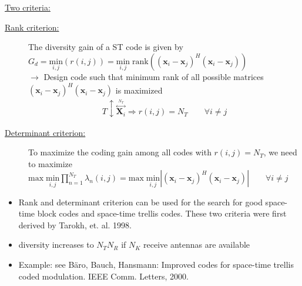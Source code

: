 \documentclass[a4paper, 10pt]{article}
\begin{document}
\vspace{1.6cm}
{\large\underline{Two criteria:}}\\
	\begin{description}
		\item[\underline{Rank criterion:}]The diversity gain of a ST code is given by \\
		$G_d=\underset{i,j}{\mathrm{min}}(r(i,j))=\underset{i,j}{\mathrm{min}}\;\mathrm{rank}\left((\mathbf{x}_i-\mathbf{x}_j)^H(\mathbf{x}_i-\mathbf{x}_j)\right)$\\
		$\rightarrow$ Design code such that minimum rank of all possible matrices $(\mathbf{x}_i-\mathbf{x}_j)^H(\mathbf{x}_i-\mathbf{x}_j)$ is maximized
		\begin{align*}
			T \updownarrow  \overset{\overset{N_T}{\longleftrightarrow}}{\mathbf{X}_i} \Rightarrow r(i,j)=N_T\qquad \forall i\neq j
		\end{align*}
		\item[\underline{Determinant criterion:}]To maximize the coding gain among all codes with $r(i,j)=N_T$, we need to maximize 
		$\mathrm{max}\;\underset{i,j}{\mathrm{min}}\prod\limits_{n=1}^{N_T}\lambda_n(i,j)=\mathrm{max}\;\underset{i,j}{\mathrm{min}}\left|(\mathbf{x}_i-\mathbf{x}_j)^H(\mathbf{x}_i-\mathbf{x}_j)\right| \qquad \forall i \neq j$
	\end{description}
\begin{itemize}
	\item Rank and determinant criterion can be used for the search for good space-time block codes and space-time trellis codes. These two criteria were first derived by Tarokh, et. al. 1998.
	\item diversity increases to $N_TN_R$ if $N_K$ receive antennas are available
	\item Example: see B\"aro, Bauch, Hansmann: Improved codes for space-time trellis coded modulation. IEEE Comm. Letters, 2000.
\end{itemize}
\end{document}
